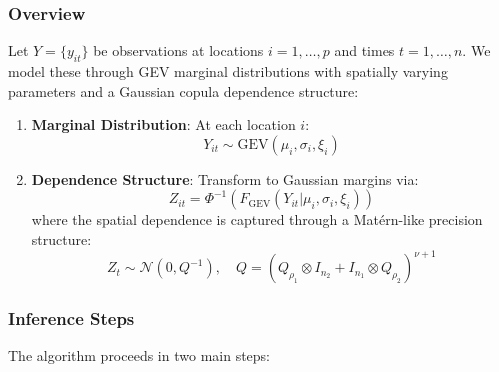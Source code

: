 \documentclass[
  letterpaper,
  DIV=11,
  numbers=noendperiod]{scrartcl}
\begin{document}
\subsubsection{Overview}\label{overview}

Let \(Y = \{y_{it}\}\) be observations at locations \(i=1,\ldots,p\) and
times \(t=1,\ldots,n\). We model these through GEV marginal
distributions with spatially varying parameters and a Gaussian copula
dependence structure:

\begin{enumerate}
\def\labelenumi{\arabic{enumi}.}
\item
  \textbf{Marginal Distribution}: At each location \(i\):
  \[Y_{it} \sim \mathrm{GEV}(\mu_i, \sigma_i, \xi_i)\]
\item
  \textbf{Dependence Structure}: Transform to Gaussian margins via:
  \[Z_{it} = \Phi^{-1}(F_{\mathrm{GEV}}(Y_{it}|\mu_i,\sigma_i,\xi_i))\]
  where the spatial dependence is captured through a Matérn-like
  precision structure:
  \[Z_t \sim \mathcal{N}(0, Q^{-1}), \quad Q = (Q_{\rho_1} \otimes I_{n_2} + I_{n_1} \otimes Q_{\rho_2})^{\nu+1}\]
\end{enumerate}

\subsubsection{Inference Steps}\label{inference-steps}

The algorithm proceeds in two main steps:
\end{document}
